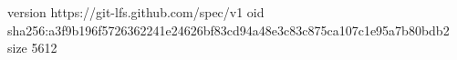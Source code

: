version https://git-lfs.github.com/spec/v1
oid sha256:a3f9b196f5726362241e24626bf83cd94a48e3c83c875ca107c1e95a7b80bdb2
size 5612
